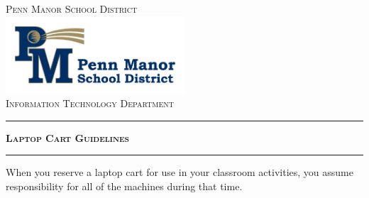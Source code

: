 \begin{titlepage}

\begin{center}

\textsc{\LARGE Penn Manor School District}\\[1.5cm]


\includegraphics[width=0.5\textwidth]{images/logo}\\[1cm]    


\textsc{\Large Information Technology Department}\\[0.5cm]


\hrule 
\huge \bfseries \textsc{Laptop Cart Guidelines}\\[0.4cm]
\hrule 
\end{center}

\vfill
\flushleft When you reserve a laptop cart for use in your classroom activities, you assume responsibility for all of the machines during that time. 


\end{titlepage}
